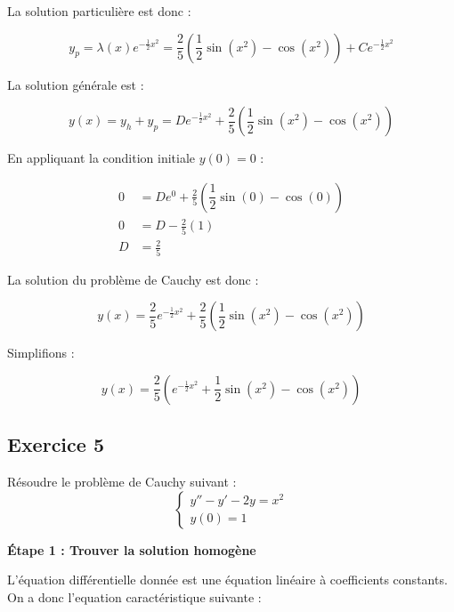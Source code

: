 \documentclass{article}
\begin{document}
La solution particulière est donc :

\begin{equation*}
y_p = \lambda(x) e^{ - \frac{1}{2} x^2 } = \frac{2}{5} \left( \dfrac{1}{2} \sin( x^2 ) - \cos( x^2 ) \right ) + C e^{ - \frac{1}{2} x^2 }
\end{equation*}

La solution générale est :

\begin{equation*}
y(x) = y_h + y_p = D e^{ - \frac{1}{2} x^2 } + \frac{2}{5} \left( \dfrac{1}{2} \sin( x^2 ) - \cos( x^2 ) \right )
\end{equation*}

En appliquant la condition initiale \(y(0) = 0\) :

\begin{align*}
0 &= D e^{ 0 } + \frac{2}{5} \left( \dfrac{1}{2} \sin( 0 ) - \cos( 0 ) \right ) \\
0 &= D - \frac{2}{5} (1) \\
D &= \frac{2}{5}
\end{align*}

La solution du problème de Cauchy est donc :

\begin{equation*}
y(x) = \frac{2}{5} e^{ - \frac{1}{2} x^2 } + \frac{2}{5} \left( \dfrac{1}{2} \sin( x^2 ) - \cos( x^2 ) \right )
\end{equation*}

Simplifions :

\begin{equation*}
y(x) = \frac{2}{5} \left( e^{ - \frac{1}{2} x^2 } + \dfrac{1}{2} \sin( x^2 ) - \cos( x^2 ) \right )
\end{equation*}


\subsection{Exercice 5}

Résoudre le problème de Cauchy suivant :
\begin{equation*}
\begin{cases}
    y'' - y' - 2y = x^2 \\
    y(0)=1
\end{cases}
\end{equation*}


\textbf{Étape 1 : Trouver la solution homogène}

L'équation différentielle donnée est une équation linéaire à coefficients constants.
On a donc l'equation caractéristique suivante :
\end{document}
